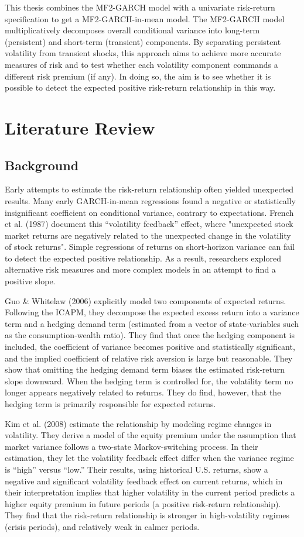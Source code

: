 \documentclass[12pt]{article}
\begin{document}
This thesis combines the MF2-GARCH model with a univariate risk-return specification to get a MF2-GARCH-in-mean model. The MF2-GARCH model multiplicatively decomposes overall conditional variance into long-term (persistent) and short-term (transient) components. By separating persistent volatility from transient shocks, this approach aims to achieve more accurate measures of risk and to test whether each volatility component commands a different risk premium (if any). In doing so, the aim is to see whether it is possible to detect the expected positive risk-return relationship in this way.

\section{Literature Review}
\subsection{Background}
Early attempts to estimate the risk-return relationship often yielded unexpected results. Many early GARCH-in-mean regressions found a negative or statistically insignificant coefficient on conditional variance, contrary to expectations. French et al. (1987) document this “volatility feedback” effect, where "unexpected stock market returns are negatively related to the unexpected change in the volatility of stock returns". Simple regressions of returns on short-horizon variance can fail to detect the expected positive relationship. As a result, researchers explored alternative risk measures and more complex models in an attempt to find a positive slope.\par
Guo \& Whitelaw (2006) explicitly model two components of expected returns. Following the ICAPM, they decompose the expected excess return into a variance term and a hedging demand term (estimated from a vector of state-variables such as the consumption-wealth ratio). They find that once the hedging component is included, the coefficient of variance becomes positive and statistically significant, and the implied coefficient of relative risk aversion is large but reasonable. They show that omitting the hedging demand term biases the estimated risk‐return slope downward. When the hedging term is controlled for, the volatility term no longer appears negatively related to returns. They do find, however, that the hedging term is primarily responsible for expected returns.\par
Kim et al. (2008) estimate the relationship by modeling regime changes in volatility. They derive a model of the equity premium under the assumption that market variance follows a two-state Markov-switching process. In their estimation, they let the volatility feedback effect differ when the variance regime is “high” versus “low.” Their results, using historical U.S. returns, show a negative and significant volatility feedback effect on current returns, which in their interpretation implies that higher volatility in the current period predicts a higher equity premium in future periods (a positive risk-return relationship). They find that the risk-return relationship is stronger in high-volatility regimes (crisis periods), and relatively weak in calmer periods.\par
\end{document}
